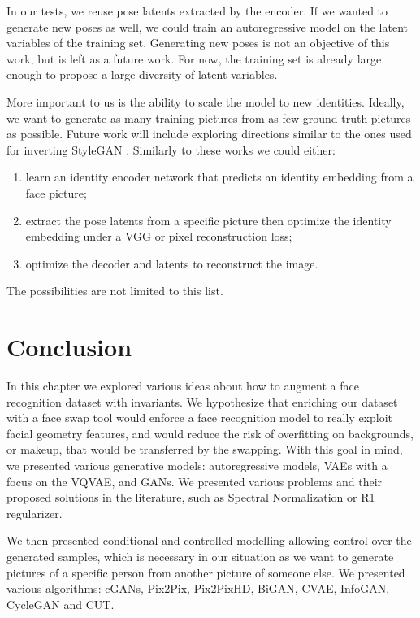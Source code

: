 In our tests, we reuse pose latents extracted by the encoder. If we wanted to generate new poses as well, we could train an autoregressive model on the latent variables of the training set. Generating new poses is not an objective of this work, but is left as a future work. For now, the training set is already large enough to propose a large diversity of latent variables. 

More important to us is the ability to scale the model to new identities. Ideally, we want to generate as many training pictures from as few ground truth pictures as possible. Future work will include exploring directions similar to the ones used for inverting StyleGAN \cite{inverting,pivotaltuning}. Similarly to these works we could either:

\begin{enumerate}
    \item learn an identity encoder network that predicts an identity embedding from a face picture;
    \item extract the pose latents from a specific picture then optimize the identity embedding under a VGG or pixel reconstruction loss;
    \item optimize the decoder and latents to reconstruct the image.
\end{enumerate}

The possibilities are not limited to this list.

\section{Conclusion}

In this chapter we explored various ideas about how to augment a face recognition dataset with invariants. We hypothesize that enriching our dataset with a face swap tool would enforce a face recognition model to really exploit facial geometry features, and would reduce the risk of overfitting on backgrounds, or makeup, that would be transferred by the swapping. With this goal in mind, we presented various generative models: autoregressive models, \acp{VAE} with a focus on the \ac{VQVAE}, and \acp{GAN}. We presented various problems and their proposed solutions in the literature, such as Spectral Normalization or R1 regularizer.

We then presented conditional and controlled modelling allowing control over the generated samples, which is necessary in our situation as we want to generate pictures of a specific person from another picture of someone else. We presented various algorithms: cGANs, Pix2Pix, Pix2PixHD, BiGAN, CVAE, InfoGAN, CycleGAN and CUT.

